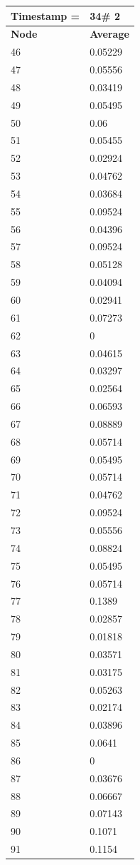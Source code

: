 \begin{tabular}{|l||l|}
\hline
\textbf{Timestamp =} & \textbf{34}\# 2\\\hline
	\textbf{Node} & \textbf{Average} \\ \hline
\hline
	46 & 0.05229 \\ \hline
	47 & 0.05556 \\ \hline
	48 & 0.03419 \\ \hline
	49 & 0.05495 \\ \hline
	50 & 0.06 \\ \hline
	51 & 0.05455 \\ \hline
	52 & 0.02924 \\ \hline
	53 & 0.04762 \\ \hline
	54 & 0.03684 \\ \hline
	55 & 0.09524 \\ \hline
	56 & 0.04396 \\ \hline
	57 & 0.09524 \\ \hline
	58 & 0.05128 \\ \hline
	59 & 0.04094 \\ \hline
	60 & 0.02941 \\ \hline
	61 & 0.07273 \\ \hline
	62 & 0 \\ \hline
	63 & 0.04615 \\ \hline
	64 & 0.03297 \\ \hline
	65 & 0.02564 \\ \hline
	66 & 0.06593 \\ \hline
	67 & 0.08889 \\ \hline
	68 & 0.05714 \\ \hline
	69 & 0.05495 \\ \hline
	70 & 0.05714 \\ \hline
	71 & 0.04762 \\ \hline
	72 & 0.09524 \\ \hline
	73 & 0.05556 \\ \hline
	74 & 0.08824 \\ \hline
	75 & 0.05495 \\ \hline
	76 & 0.05714 \\ \hline
	77 & 0.1389 \\ \hline
	78 & 0.02857 \\ \hline
	79 & 0.01818 \\ \hline
	80 & 0.03571 \\ \hline
	81 & 0.03175 \\ \hline
	82 & 0.05263 \\ \hline
	83 & 0.02174 \\ \hline
	84 & 0.03896 \\ \hline
	85 & 0.0641 \\ \hline
	86 & 0 \\ \hline
	87 & 0.03676 \\ \hline
	88 & 0.06667 \\ \hline
	89 & 0.07143 \\ \hline
	90 & 0.1071 \\ \hline
	91 & 0.1154 \\ \hline
\end{tabular}
